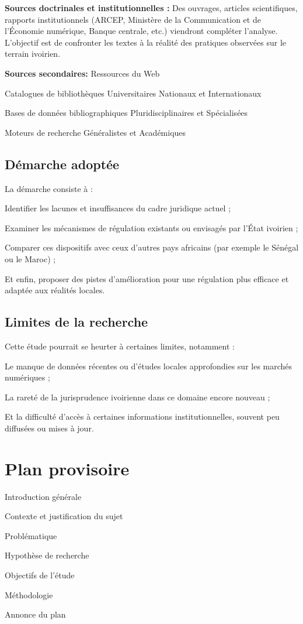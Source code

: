 \textbf{Sources doctrinales et institutionnelles :}
Des ouvrages, articles scientifiques, rapports institutionnels (ARCEP, Ministère de la Communication et de l’Économie numérique, Banque centrale, etc.) viendront compléter l’analyse.
L’objectif est de confronter les textes à la réalité des pratiques observées sur le terrain ivoirien.

\textbf{Sources secondaires:} Ressources du Web 

Catalogues de bibliothèques Universitaires Nationaux et Internationaux

 Bases de données bibliographiques Pluridisciplinaires et Spécialisées 

Moteurs de recherche Généralistes et Académiques

\subsection*{Démarche adoptée}

La démarche consiste à :

Identifier les lacunes et insuffisances du cadre juridique actuel ;

Examiner les mécanismes de régulation existants ou envisagés par l’État ivoirien ;

Comparer ces dispositifs avec ceux d’autres pays africains (par exemple le Sénégal ou le Maroc) ;

Et enfin, proposer des pistes d’amélioration pour une régulation plus efficace et adaptée aux réalités locales.

\subsection*{Limites de la recherche}

Cette étude pourrait se heurter à certaines limites, notamment :

Le manque de données récentes ou d’études locales approfondies sur les marchés numériques ;

La rareté de la jurisprudence ivoirienne dans ce domaine encore nouveau ;

Et la difficulté d’accès à certaines informations institutionnelles, souvent peu diffusées ou mises à jour.

\section*{Plan provisoire}

Introduction générale

Contexte et justification du sujet

Problématique

Hypothèse de recherche

Objectifs de l’étude

Méthodologie

Annonce du plan